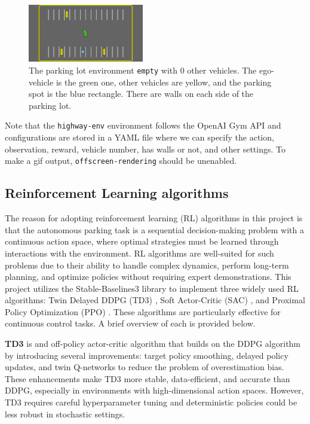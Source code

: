 \documentclass{article}
\begin{document}
\begin{figure}[h]
    \centering
    \includegraphics[width=0.45\textwidth]{./pics/parking.jpg}
    \caption{The parking lot environment \texttt{empty} with 0 other vehicles. The ego-vehicle is the green one, other vehicles are yellow, and the parking spot is the blue rectangle. There are walls on each side of the parking lot.}
    \label{fig:parking_lot}
\end{figure}

Note that the \texttt{highway-env} environment follows the OpenAI Gym API and configurations are stored in a YAML file where we can specify the action, observation, reward, vehicle number, has walls or not, and other settings. To make a gif output, \texttt{offscreen-rendering} should be unenabled.

\subsection{Reinforcement Learning algorithms}

The reason for adopting reinforcement learning (RL) algorithms in this project is that the autonomous parking task is a sequential decision-making problem with a continuous action space, where optimal strategies must be learned through interactions with the environment. RL algorithms are well-suited for such problems due to their ability to handle complex dynamics, perform long-term planning, and optimize policies without requiring expert demonstrations. This project utilizes the Stable-Baselines3 \cite{stable-baselines3} library to implement three widely used RL algorithms: Twin Delayed DDPG (TD3) \cite{fujimoto2018addressing}, Soft Actor-Critic (SAC) \cite{haarnoja2018soft}, and Proximal Policy Optimization (PPO) \cite{schulman2017proximal}. These algorithms are particularly effective for continuous control tasks. A brief overview of each is provided below.

\textbf{TD3} is and off-policy actor-critic algorithm that builds on the DDPG algorithm by introducing several improvements: target policy smoothing, delayed policy updates, and twin Q-networks to reduce the problem of overestimation bias. These enhancements make TD3 more stable, data-efficient, and accurate than DDPG, especially in environments with high-dimensional action spaces. However, TD3 requires careful hyperparameter tuning and deterministic policies could be less robust in stochastic settings.
\end{document}
